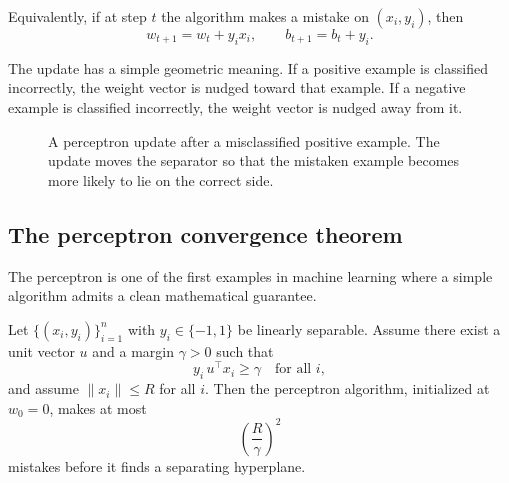 Equivalently, if at step $t$ the algorithm makes a mistake on $(x_i,y_i)$, then
\[
w_{t+1}=w_t+y_i x_i,
\qquad
b_{t+1}=b_t+y_i.
\]

The update has a simple geometric meaning. If a positive example is classified incorrectly, the weight vector is nudged toward that example. If a negative example is classified incorrectly, the weight vector is nudged away from it.

\begin{figure}[tbp]
\centering
{}
\caption{A perceptron update after a misclassified positive example. The update moves the separator so that the mistaken example becomes more likely to lie on the correct side.}
\end{figure}

\subsection*{The perceptron convergence theorem}

The perceptron is one of the first examples in machine learning where a simple algorithm admits a clean mathematical guarantee.

\begin{theorem}
Let $\{(x_i,y_i)\}_{i=1}^n$ with $y_i\in\{-1,1\}$ be linearly separable. Assume there exist a unit vector $u$ and a margin $\gamma>0$ such that
\[
y_i\,u^\top x_i \ge \gamma
\quad \text{for all } i,
\]
and assume $\|x_i\|\le R$ for all $i$. Then the perceptron algorithm, initialized at $w_0=0$, makes at most
\[
\left(\frac{R}{\gamma}\right)^2
\]
mistakes before it finds a separating hyperplane.
\end{theorem}


